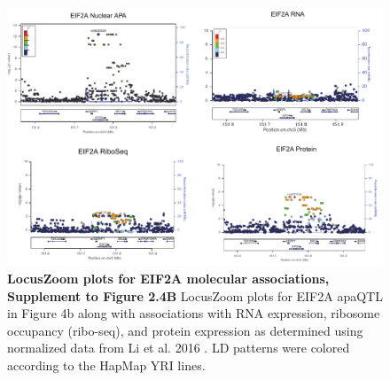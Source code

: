 \begin{figure}[!htb]
\centering
\includegraphics[width=5in]{img/ch02/Fig4_figuresupplement2.pdf}
\caption[LocusZoom plots for EIF2A molecular associations, Supplement to Figure 2.4B]{\textbf{LocusZoom plots for EIF2A molecular associations, Supplement to Figure 2.4B} LocusZoom plots for EIF2A apaQTL in Figure 4b along with associations with RNA expression, ribosome occupancy (ribo-seq), and protein expression as determined using normalized data from Li et al. 2016 \citep{li_rna_2016}. LD patterns were colored according to the HapMap YRI lines.}
\label{fig:locuszoom}
\end{figure}
\clearpage




